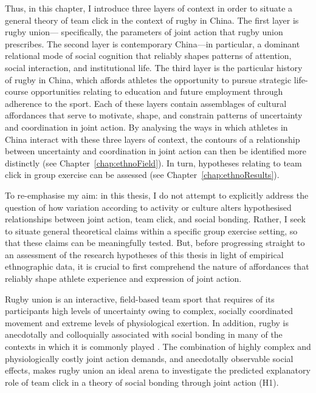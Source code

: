 \begin{CJK}{UTF8}{gbsn}
Thus, in this chapter, I introduce three layers of context in order to situate a general theory of team click in the context of rugby in China.  The first layer is rugby union--- specifically, the parameters of joint action that rugby union prescribes.  The second layer is contemporary China---in particular, a dominant relational mode of social cognition that reliably shapes patterns of attention, social interaction, and institutional life.  The third layer is the particular history of rugby in China, which affords athletes the opportunity to pursue strategic life-course opportunities relating to education and future employment through adherence to the sport.  Each of these layers contain assemblages of cultural affordances that serve to motivate, shape, and constrain patterns of uncertainty and coordination in joint action.  By analysing the ways in which athletes in China interact with these three layers of context, the contours of a relationship between uncertainty and coordination in joint action can then be identified more distinctly (see Chapter~\ref{chap:ethnoField}).  In turn, hypotheses relating to team click in group exercise can be assessed (see Chapter~\ref{chap:ethnoResults}).

To re-emphasise my aim: in this thesis, I do not attempt to explicitly address the question of how variation according to activity or culture alters hypothesised relationships between joint action, team click, and social bonding.  Rather, I seek to situate general theoretical claims within a specific group exercise setting, so that these claims can be meaningfully tested.  But, before progressing straight to an assessment of the research hypotheses of this thesis in light of empirical ethnographic data, it is crucial to first comprehend the nature of affordances that reliably shape athlete experience and expression of joint action.

Rugby union is an interactive, field-based team sport that requires of its participants high levels of uncertainty owing to complex, socially coordinated movement and extreme levels of physiological exertion.  In addition, rugby is anecdotally and colloquially associated with social bonding in many of the contexts in which it is commonly played \citep{Dunning2005}.  The combination of highly complex and physiologically costly joint action demands, and anecdotally observable social effects, makes rugby union an ideal arena to investigate the predicted explanatory role of team click in a theory of social bonding through joint action (H1).


\end{CJK}
